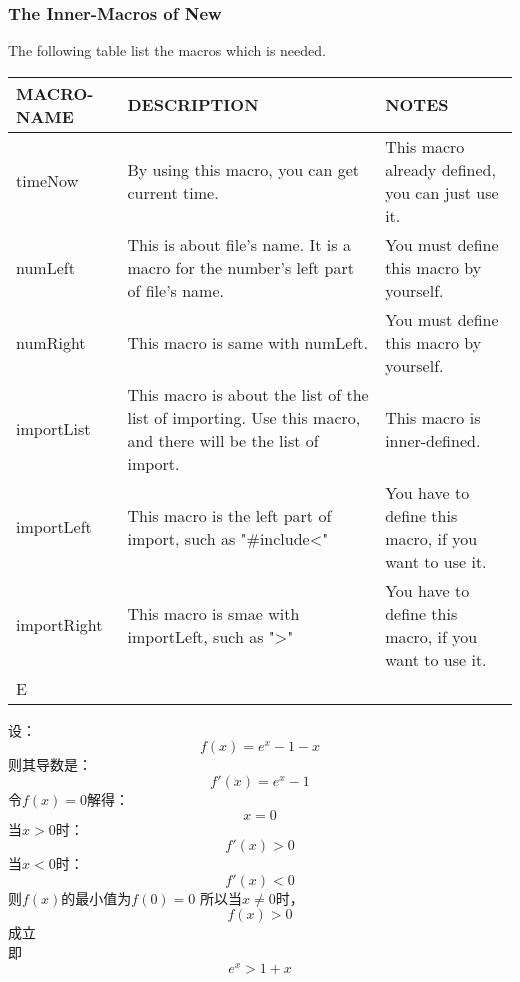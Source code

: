\documentclass[UTF8]{article} %
\begin{document}
\subsubsection{The Inner-Macros of New}
The following table list the macros which is needed.
\begin{center}
    \begin{tabular}{|p{}|p{}|p{}|}
    \hline \rule[-2ex]{0pt}{5.5ex} MACRO-NAME & DESCRIPTION & NOTES \\ 
    \hline \rule[-2ex]{0pt}{5.5ex} timeNow & By using this macro, you can get current time. & This macro already defined, you can just use it. \\ 
    \hline \rule[-2ex]{0pt}{5.5ex} numLeft & This is about file's name. It is a macro for the number's left part of file's name. & You must define this macro by yourself. \\ 
    \hline \rule[-2ex]{0pt}{5.5ex} numRight & This macro is same with numLeft. & You must define this macro by yourself. \\ 
    \hline \rule[-2ex]{0pt}{5.5ex} importList & This macro is about the list of the list of importing. Use this macro, and there will be the list of import.   & This macro is inner-defined. \\ 
    \hline \rule[-2ex]{0pt}{5.5ex} importLeft & This macro is the left part of import, such as "\#include<" & You have to define this macro, if you want to use it.  \\ 
    \hline \rule[-2ex]{0pt}{5.5ex} importRight & This macro is smae with importLeft, such as ">" & You have to define this macro, if you want to use it. \\ 
    \hline \rule[-2ex]{0pt}{5.5ex} E
\end{tabular} 

\end{center}
\newpage
设：
$$f(x)=e^x-1-x$$
则其导数是：
$$f'(x)=e^x-1$$
令$f(x)=0$解得：
$$x=0$$
当$x>0$时：$$f'(x)>0$$
当$x<0$时：$$f'(x)<0$$
则$f(x)$的最小值为$f(0)=0$
所以当$x\neq 0$时，$$f(x)>0$$成立\\
即
$$e^x>1+x$$
\end{document}
